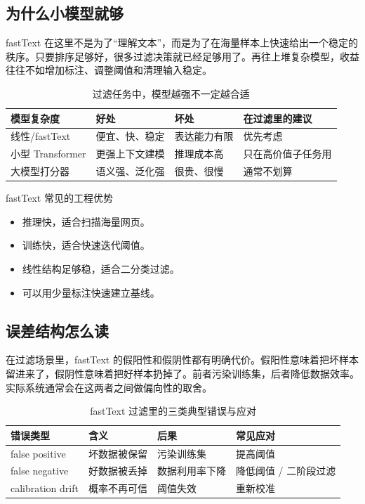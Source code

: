 \documentclass[a4paper]{article}
\begin{document}
\subsection{为什么小模型就够}

fastText 在这里不是为了“理解文本”，而是为了在海量样本上快速给出一个稳定的秩序。只要排序足够好，很多过滤决策就已经足够用了。再往上堆复杂模型，收益往往不如增加标注、调整阈值和清理输入稳定。

\begin{table}[H]
\centering
\small
\renewcommand{\arraystretch}{1.15}
\begin{tabular}{p{2.5cm}p{4.2cm}p{4.0cm}p{3.0cm}}
\toprule
\textbf{模型复杂度} & \textbf{好处} & \textbf{坏处} & \textbf{在过滤里的建议} \\
\midrule
线性/fastText & 便宜、快、稳定 & 表达能力有限 & 优先考虑 \\
小型 Transformer & 更强上下文建模 & 推理成本高 & 只在高价值子任务用 \\
大模型打分器 & 语义强、泛化强 & 很贵、很慢 & 通常不划算 \\
\bottomrule
\end{tabular}
\caption{过滤任务中，模型越强不一定越合适}
\end{table}

\begin{knowledgebox}{fastText 常见的工程优势}
\begin{itemize}
    \item 推理快，适合扫描海量网页。
    \item 训练快，适合快速迭代阈值。
    \item 线性结构足够稳，适合二分类过滤。
    \item 可以用少量标注快速建立基线。
\end{itemize}
\end{knowledgebox}

\subsection{误差结构怎么读}

在过滤场景里，fastText 的假阳性和假阴性都有明确代价。假阳性意味着把坏样本留进来了，假阴性意味着把好样本扔掉了。前者污染训练集，后者降低数据效率。实际系统通常会在这两者之间做偏向性的取舍。

\begin{table}[H]
\centering
\small
\renewcommand{\arraystretch}{1.15}
\begin{tabular}{p{2.7cm}p{4.1cm}p{4.1cm}p{2.8cm}}
\toprule
\textbf{错误类型} & \textbf{含义} & \textbf{后果} & \textbf{常见应对} \\
\midrule
false positive & 坏数据被保留 & 污染训练集 & 提高阈值 \\
false negative & 好数据被丢掉 & 数据利用率下降 & 降低阈值 / 二阶段过滤 \\
calibration drift & 概率不再可信 & 阈值失效 & 重新校准 \\
\bottomrule
\end{tabular}
\caption{fastText 过滤里的三类典型错误与应对}
\end{table}
\end{document}
